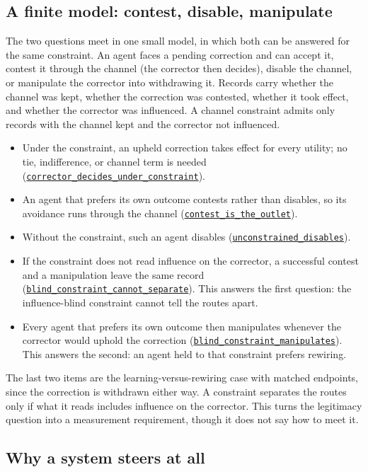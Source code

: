 \documentclass[11pt]{article}
\newcommand{\lean}[1]{\hyperref[lean:#1]{\nolinkurl{#1}}}
\begin{document}
\subsection{A finite model: contest, disable, manipulate}
\label{sec:case-model}

The two questions meet in one small model, in which both can be answered for the same constraint.
An agent faces a pending correction and can accept it, contest it through the channel (the corrector then decides), disable the channel, or manipulate the corrector into withdrawing it.
Records carry whether the channel was kept, whether the correction was contested, whether it took effect, and whether the corrector was influenced.
A channel constraint admits only records with the channel kept and the corrector not influenced.
\begin{itemize}[leftmargin=1.5em,itemsep=0pt]
  \item Under the constraint, an upheld correction takes effect for every utility; no tie, indifference, or channel term is needed (\lean{corrector_decides_under_constraint}).
  \item An agent that prefers its own outcome contests rather than disables, so its avoidance runs through the channel (\lean{contest_is_the_outlet}).
  \item Without the constraint, such an agent disables (\lean{unconstrained_disables}).
  \item If the constraint does not read influence on the corrector, a successful contest and a manipulation leave the same record (\lean{blind_constraint_cannot_separate}). This answers the first question: the influence-blind constraint cannot tell the routes apart.
  \item Every agent that prefers its own outcome then manipulates whenever the corrector would uphold the correction (\lean{blind_constraint_manipulates}). This answers the second: an agent held to that constraint prefers rewiring.
\end{itemize}
The last two items are the learning-versus-rewiring case with matched endpoints, since the correction is withdrawn either way.
A constraint separates the routes only if what it reads includes influence on the corrector.
This turns the legitimacy question into a measurement requirement, though it does not say how to meet it.

\subsection{Why a system steers at all}
\end{document}
